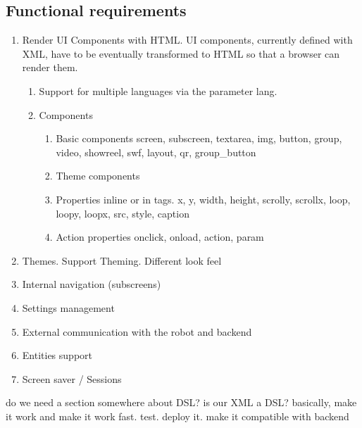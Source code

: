 \subsection{Functional requirements}
\begin{enumerate}
    \item Render UI Components with HTML. UI components, currently defined with XML, have to be eventually transformed to HTML so that a browser can render them.
    \begin{enumerate}
        \item Support for multiple languages via the parameter lang.
        \item Components 
        \begin{enumerate}
            \item Basic components screen, subscreen, textarea, img, button, group, video, showreel, swf, layout, qr, group\_button
            \item Theme components
            \item Properties inline or in tags. x, y, width, height, scrolly, scrollx, loop, loopy, loopx, src, style, caption
            \item Action properties onclick, onload, action, param
        \end{enumerate}
        
    \end{enumerate}
    \item Themes. Support Theming. Different look feel
    \item Internal navigation (subscreens)
    \item Settings management
    \item External communication with the robot and backend
    \item Entities support
    \item Screen saver / Sessions
\end{enumerate}


do we need a section somewhere about DSL? is our XML a DSL?
basically, make it work and make it work fast. test. deploy it. make it compatible with backend

